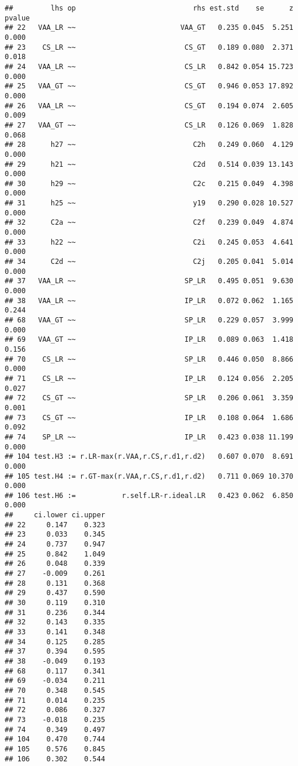 \documentclass[
]{article}
\begin{document}
\begin{verbatim}
##         lhs op                            rhs est.std    se      z pvalue
## 22   VAA_LR ~~                         VAA_GT   0.235 0.045  5.251  0.000
## 23    CS_LR ~~                          CS_GT   0.189 0.080  2.371  0.018
## 24   VAA_LR ~~                          CS_LR   0.842 0.054 15.723  0.000
## 25   VAA_GT ~~                          CS_GT   0.946 0.053 17.892  0.000
## 26   VAA_LR ~~                          CS_GT   0.194 0.074  2.605  0.009
## 27   VAA_GT ~~                          CS_LR   0.126 0.069  1.828  0.068
## 28      h27 ~~                            C2h   0.249 0.060  4.129  0.000
## 29      h21 ~~                            C2d   0.514 0.039 13.143  0.000
## 30      h29 ~~                            C2c   0.215 0.049  4.398  0.000
## 31      h25 ~~                            y19   0.290 0.028 10.527  0.000
## 32      C2a ~~                            C2f   0.239 0.049  4.874  0.000
## 33      h22 ~~                            C2i   0.245 0.053  4.641  0.000
## 34      C2d ~~                            C2j   0.205 0.041  5.014  0.000
## 37   VAA_LR ~~                          SP_LR   0.495 0.051  9.630  0.000
## 38   VAA_LR ~~                          IP_LR   0.072 0.062  1.165  0.244
## 68   VAA_GT ~~                          SP_LR   0.229 0.057  3.999  0.000
## 69   VAA_GT ~~                          IP_LR   0.089 0.063  1.418  0.156
## 70    CS_LR ~~                          SP_LR   0.446 0.050  8.866  0.000
## 71    CS_LR ~~                          IP_LR   0.124 0.056  2.205  0.027
## 72    CS_GT ~~                          SP_LR   0.206 0.061  3.359  0.001
## 73    CS_GT ~~                          IP_LR   0.108 0.064  1.686  0.092
## 74    SP_LR ~~                          IP_LR   0.423 0.038 11.199  0.000
## 104 test.H3 := r.LR-max(r.VAA,r.CS,r.d1,r.d2)   0.607 0.070  8.691  0.000
## 105 test.H4 := r.GT-max(r.VAA,r.CS,r.d1,r.d2)   0.711 0.069 10.370  0.000
## 106 test.H6 :=           r.self.LR-r.ideal.LR   0.423 0.062  6.850  0.000
##     ci.lower ci.upper
## 22     0.147    0.323
## 23     0.033    0.345
## 24     0.737    0.947
## 25     0.842    1.049
## 26     0.048    0.339
## 27    -0.009    0.261
## 28     0.131    0.368
## 29     0.437    0.590
## 30     0.119    0.310
## 31     0.236    0.344
## 32     0.143    0.335
## 33     0.141    0.348
## 34     0.125    0.285
## 37     0.394    0.595
## 38    -0.049    0.193
## 68     0.117    0.341
## 69    -0.034    0.211
## 70     0.348    0.545
## 71     0.014    0.235
## 72     0.086    0.327
## 73    -0.018    0.235
## 74     0.349    0.497
## 104    0.470    0.744
## 105    0.576    0.845
## 106    0.302    0.544
\end{verbatim}
\end{document}
